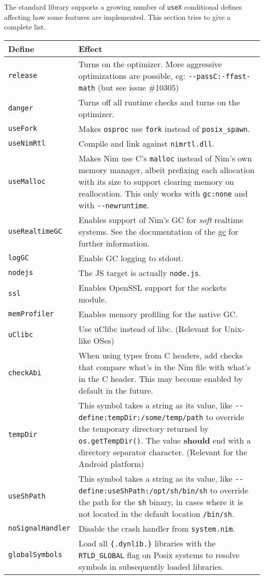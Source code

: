 The standard library supports a growing number of \texttt{useX}
conditional defines affecting how some features are implemented. This
section tries to give a complete list.

\begin{longtable}[]{@{}ll@{}}
\toprule
Define & Effect\tabularnewline
\midrule
\endhead
\texttt{release} & Turns on the optimizer. More aggressive optimizations
are possible, eg: \texttt{-\/-passC:-ffast-math} (but see issue
\#10305)\tabularnewline
\texttt{danger} & Turns off all runtime checks and turns on the
optimizer.\tabularnewline
\texttt{useFork} & Makes \texttt{osproc} use \texttt{fork} instead of
\texttt{posix\_spawn}.\tabularnewline
\texttt{useNimRtl} & Compile and link against
\texttt{nimrtl.dll}.\tabularnewline
\texttt{useMalloc} & Makes Nim use C's \texttt{malloc} instead of Nim's
own memory manager, albeit prefixing each allocation with its size to
support clearing memory on reallocation. This only works with
\texttt{gc:none} and with \texttt{-\/-newruntime}.\tabularnewline
\texttt{useRealtimeGC} & Enables support of Nim's GC for \emph{soft}
realtime systems. See the documentation of the \href{gc.html}{gc} for
further information.\tabularnewline
\texttt{logGC} & Enable GC logging to stdout.\tabularnewline
\texttt{nodejs} & The JS target is actually
\texttt{node.js}.\tabularnewline
\texttt{ssl} & Enables OpenSSL support for the sockets
module.\tabularnewline
\texttt{memProfiler} & Enables memory profiling for the native
GC.\tabularnewline
\texttt{uClibc} & Use uClibc instead of libc. (Relevant for Unix-like
OSes)\tabularnewline
\texttt{checkAbi} & When using types from C headers, add checks that
compare what's in the Nim file with what's in the C header. This may
become enabled by default in the future.\tabularnewline
\texttt{tempDir} & This symbol takes a string as its value, like
\texttt{-\/-define:tempDir:/some/temp/path} to override the temporary
directory returned by \texttt{os.getTempDir()}. The value
\textbf{should} end with a directory separator character. (Relevant for
the Android platform)\tabularnewline
\texttt{useShPath} & This symbol takes a string as its value, like
\texttt{-\/-define:useShPath:/opt/sh/bin/sh} to override the path for
the \texttt{sh} binary, in cases where it is not located in the default
location \texttt{/bin/sh}.\tabularnewline
\texttt{noSignalHandler} & Disable the crash handler from
\texttt{system.nim}.\tabularnewline
\texttt{globalSymbols} & Load all \texttt{\{.dynlib.\}} libraries with
the \texttt{RTLD\_GLOBAL} flag on Posix systems to resolve symbols in
subsequently loaded libraries.\tabularnewline
\bottomrule
\end{longtable}

